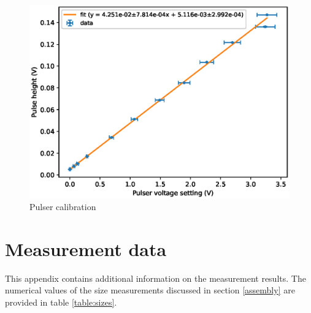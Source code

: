 \documentclass[a4paper]{article}
\begin{document}
\begin{appendices}
\begin{figure}[ht!]
\centering
\includegraphics[width=\textwidth]{fig/python/pulser_calibration.eps}
\caption{Pulser calibration}
\label{fig:pulser_calibration}
\end{figure}



\clearpage
\section{Measurement data}
This appendix contains additional information on the measurement results.
The numerical values of the size measurements discussed in section \ref{assembly} are provided in table \ref{table:sizes}.


\end{appendices}
\end{document}
